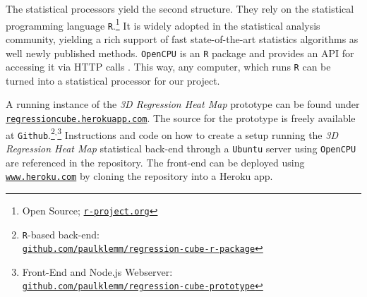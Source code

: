 \documentclass[journal]{style/vgtc} 			          %
\begin{document}
The statistical processors yield the second structure.
They rely on the statistical programming language \texttt{R}.\footnote{Open Source; \href{http://r-project.org}{\texttt{r-project.org}}}
It is widely adopted in the statistical analysis community, yielding a rich support of fast state-of-the-art statistics algorithms as well newly published methods.
\texttt{OpenCPU} is an \texttt{R} package and provides an API for accessing it via HTTP calls \cite{Ooms}.
This way, any computer, which runs \texttt{R} can be turned into a statistical processor for our project.

A running instance of the \emph{3D Regression Heat Map} prototype can be found under \href{http://regressioncube.herokuapp.com/}{\texttt{regressioncube.herokuapp.com}}.
The source for the prototype is freely available at \texttt{Github}.\footnote{\texttt{R}-based back-end: \href{https://github.com/paulklemm/regression-cube-r-package}{\\\texttt{github.com/paulklemm/regression-cube-r-package}}}$^{,}$\footnote{Front-End and Node.js Webserver: \href{https://github.com/paulklemm/regression-cube-prototype}{\texttt{\\github.com/paulklemm/regression-cube-prototype}}}
Instructions and code on how to create a setup running the \emph{3D Regression Heat Map} statistical back-end through a \texttt{Ubuntu} server using \texttt{OpenCPU} are referenced in the repository.
The front-end can be deployed using \href{https://www.heroku.com/}{\texttt{www.heroku.com}} by cloning the repository into a Heroku app.
\end{document}
